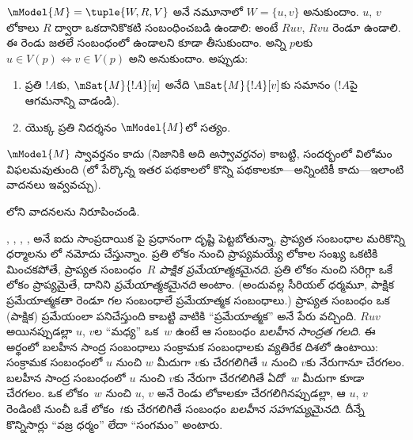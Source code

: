 \documentclass[../../../include/open-logic-section]{subfiles}
\begin{document}
\begin{prop}
  $\mModel{M} = \tuple{W, R, V}$ అనే నమూనాలో $W = \{u, v
  \}$ అనుకుందాం. $u$, $v$ లోకాలు $R$ ద్వారా
  ఒకదానికొకటి సంబంధించబడి ఉండాలి: అంటే $Ruv$,
  $Rvu$ రెండూ ఉండాలి. ఈ రెండు జతలే సంబంధంలో ఉండాలని
  కూడా తీసుకుందాం.
  అన్ని $p$లకు $u \in V(p) \Leftrightarrow v
  \in V(p)$ అని అనుకుందాం. అప్పుడు:
  \begin{enumerate}
  \item ప్రతి $!A$కు, $\mSat{M}{!A}[u]$ అనేది
    $\mSat{M}{!A}[v]$కు సమానం ($!A$పై ఆగమనాన్ని వాడండి).
  \item {} యొక్క ప్రతి నిదర్శనం $\mModel{M}$లో సత్యం.
  \end{enumerate}
  $\mModel{M}$ స్వావర్తనం కాదు (నిజానికి అది
  \emph{అస్వావర్తనం}) కాబట్టి,  సందర్భంలో
   విలోమం విఫలమవుతుంది
  (లో పేర్కొన్న ఇతర పథకాలలో
  కొన్ని పథకాలకూ---అన్నింటికీ కాదు---ఇలాంటి వాదనలు ఇవ్వవచ్చు).
\end{prop}

\begin{prob}
  లోని వాదనలను నిరూపించండి.
\end{prob}

, , , ,  అనే ఐదు
సాంప్రదాయిక పై ప్రధానంగా
దృష్టి పెట్టబోతున్నా, ప్రాప్యత సంబంధాల మరికొన్ని
ధర్మాలను లో నమోదు చేస్తున్నాం.
ప్రతి లోకం నుంచి ప్రాప్యమయ్యే లోకాల సంఖ్య ఒకటికి మించకపోతే,
ప్రాప్యత సంబంధం~$R$ \emph{పాక్షిక ప్రమేయాత్మకమైనది}.
ప్రతి లోకం నుంచి సరిగ్గా ఒకే లోకం ప్రాప్యమైతే,
దానిని \emph{ప్రమేయాత్మకమైనది} అంటాం.
(అందువల్ల సీరియల్ ధర్మమూ, పాక్షిక ప్రమేయాత్మకతా రెండూ
గల సంబంధాలే ప్రమేయాత్మక సంబంధాలు.) ప్రాప్యత సంబంధం
ఒక (పాక్షిక) ప్రమేయంలా పనిచేస్తుంది కాబట్టి వాటికి
``ప్రమేయాత్మక'' అనే పేరు వచ్చింది. $Ruv$
అయినప్పుడల్లా $u$, $v$ల ``మధ్య'' ఒక~$w$
ఉంటే ఆ సంబంధం \emph{బలహీన సాంద్రత గలది}.
ఈ అర్థంలో బలహీన సాంద్ర సంబంధాలు సంక్రామక సంబంధాలకు
వ్యతిరేక దిశలో ఉంటాయి: సంక్రామక సంబంధంలో $u$ నుంచి
$w$ మీదుగా $v$కు చేరగలిగితే $u$ నుంచి $v$కు
నేరుగానూ చేరగలం. బలహీన సాంద్ర సంబంధంలో $u$ నుంచి
$v$కు నేరుగా చేరగలిగితే ఏదో~$w$ మీదుగా కూడా
చేరగలం. ఒక లోకం~$w$ నుంచి $u$, $v$ అనే రెండు లోకాలకూ
చేరగలిగినప్పుడల్లా, ఆ $u$, $v$
రెండింటి నుంచీ ఒకే లోకం~$t$కు చేరగలిగితే సంబంధం
\emph{బలహీన సహగమ్యమైనది}. దీన్నే కొన్నిసార్లు
``వజ్ర ధర్మం'' లేదా ``సంగమం'' అంటారు.
\end{document}
